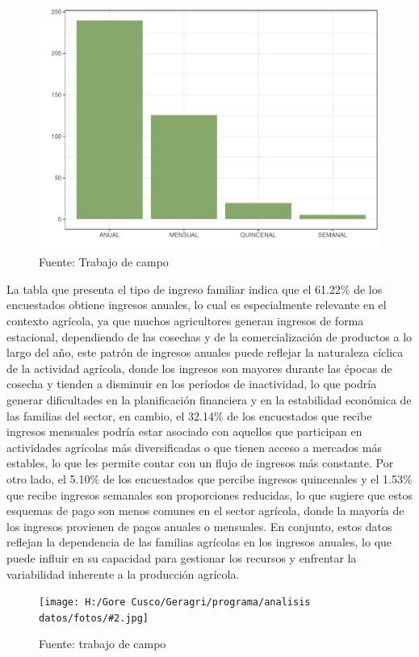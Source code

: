 \documentclass{article}\usepackage[]{graphicx}\usepackage[table]{xcolor}
\makeatletter
\def\maxwidth{ %
  \ifdim\Gin@nat@width>\linewidth
    \linewidth
  \else
    \Gin@nat@width
  \fi
}
\newenvironment{knitrout}{}{} %
\newenvironment{fotos}[2]
{\begin{figure}[H]
	\centering
	\caption{#1}
	\texttt{[image: H:/Gore Cusco/Geragri/programa/analisis datos/fotos/\#2.jpg]}
	\caption*{Fuente: trabajo de campo}}
{\end{figure}}
\makeatother
\begin{document}
\begin{figure}[H]
  \centering
  \caption{Distribucion del tipo de ingreso familiar}
\begin{knitrout}
\color{fgcolor}
\includegraphics[width=\maxwidth]{figure/fig_cinco-1} 
\end{knitrout}
  \caption*{Fuente: Trabajo de campo}
\end{figure}
La tabla que presenta el tipo de ingreso familiar indica que el 61.22\% de los encuestados obtiene ingresos anuales, lo cual es especialmente relevante en el contexto agrícola, ya que muchos agricultores generan ingresos de forma estacional, dependiendo de las cosechas y de la comercialización de productos a lo largo del año, este patrón de ingresos anuales puede reflejar la naturaleza cíclica de la actividad agrícola, donde los ingresos son mayores durante las épocas de cosecha y tienden a disminuir en los períodos de inactividad, lo que podría generar dificultades en la planificación financiera y en la estabilidad económica de las familias del sector, en cambio, el 32.14\% de los encuestados que recibe ingresos mensuales podría estar asociado con aquellos que participan en actividades agrícolas más diversificadas o que tienen acceso a mercados más estables, lo que les permite contar con un flujo de ingresos más constante. Por otro lado, el 5.10\% de los encuestados que percibe ingresos quincenales y el 1.53\% que recibe ingresos semanales son proporciones reducidas, lo que sugiere que estos esquemas de pago son menos comunes en el sector agrícola, donde la mayoría de los ingresos provienen de pagos anuales o mensuales. En conjunto, estos datos reflejan la dependencia de las familias agrícolas en los ingresos anuales, lo que puede influir en su capacidad para gestionar los recursos y enfrentar la variabilidad inherente a la producción agrícola.
\begin{fotos}
{Aplicacion de encuestas}{3}
\end{fotos}
\end{document}
